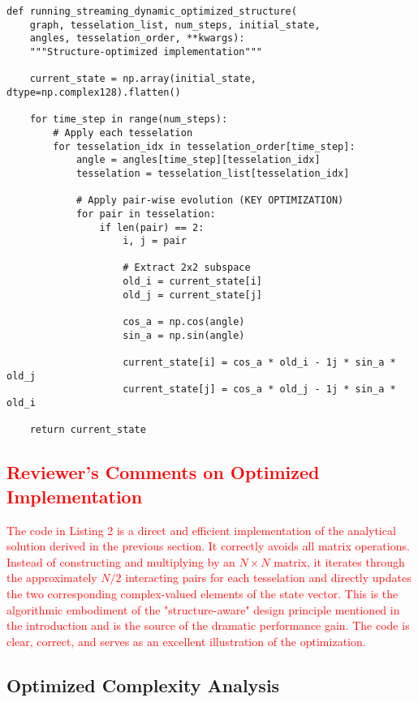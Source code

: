 \documentclass[11pt,a4paper]{article}
\begin{document}
\begin{lstlisting}[caption={Structure-optimized implementation}, label={lst:optimized}]
def running_streaming_dynamic_optimized_structure(
    graph, tesselation_list, num_steps, initial_state,
    angles, tesselation_order, **kwargs):
    """Structure-optimized implementation"""

    current_state = np.array(initial_state, dtype=np.complex128).flatten()

    for time_step in range(num_steps):
        # Apply each tesselation
        for tesselation_idx in tesselation_order[time_step]:
            angle = angles[time_step][tesselation_idx]
            tesselation = tesselation_list[tesselation_idx]
            
            # Apply pair-wise evolution (KEY OPTIMIZATION)
            for pair in tesselation:
                if len(pair) == 2:
                    i, j = pair
                    
                    # Extract 2x2 subspace
                    old_i = current_state[i]
                    old_j = current_state[j]
                    
                    cos_a = np.cos(angle)
                    sin_a = np.sin(angle)
                    
                    current_state[i] = cos_a * old_i - 1j * sin_a * old_j
                    current_state[j] = cos_a * old_j - 1j * sin_a * old_i

    return current_state
\end{lstlisting}

\textcolor{red}{
\subsection*{Reviewer's Comments on Optimized Implementation}
The code in Listing 2 is a direct and efficient implementation of the analytical solution derived in the previous section. It correctly avoids all matrix operations. Instead of constructing and multiplying by an $N \times N$ matrix, it iterates through the approximately $N/2$ interacting pairs for each tesselation and directly updates the two corresponding complex-valued elements of the state vector. This is the algorithmic embodiment of the "structure-aware" design principle mentioned in the introduction and is the source of the dramatic performance gain. The code is clear, correct, and serves as an excellent illustration of the optimization.
}

\subsection{Optimized Complexity Analysis}
\end{document}
